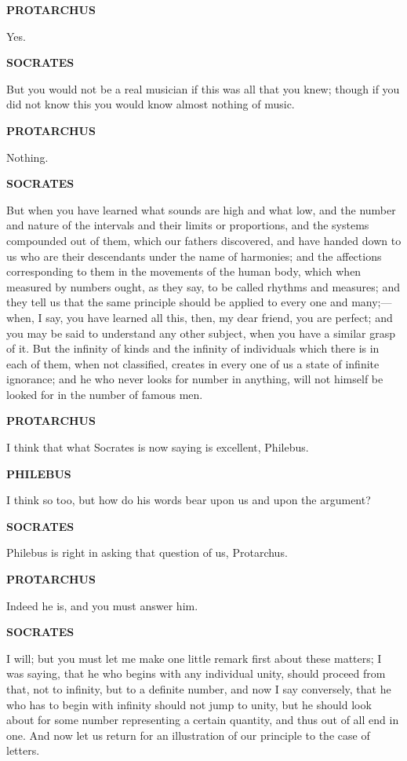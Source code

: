 \documentclass[11pt,letter]{article}
\begin{document}
\par \textbf{PROTARCHUS}
\par   Yes.

\par \textbf{SOCRATES}
\par   But you would not be a real musician if this was all that you knew; though if you did not know this you would know almost nothing of music.

\par \textbf{PROTARCHUS}
\par   Nothing.

\par \textbf{SOCRATES}
\par   But when you have learned what sounds are high and what low, and the number and nature of the intervals and their limits or proportions, and the systems compounded out of them, which our fathers discovered, and have handed down to us who are their descendants under the name of harmonies; and the affections corresponding to them in the movements of the human body, which when measured by numbers ought, as they say, to be called rhythms and measures; and they tell us that the same principle should be applied to every one and many;—when, I say, you have learned all this, then, my dear friend, you are perfect; and you may be said to understand any other subject, when you have a similar grasp of it. But the infinity of kinds and the infinity of individuals which there is in each of them, when not classified, creates in every one of us a state of infinite ignorance; and he who never looks for number in anything, will not himself be looked for in the number of famous men.

\par \textbf{PROTARCHUS}
\par   I think that what Socrates is now saying is excellent, Philebus.

\par \textbf{PHILEBUS}
\par   I think so too, but how do his words bear upon us and upon the argument?

\par \textbf{SOCRATES}
\par   Philebus is right in asking that question of us, Protarchus.

\par \textbf{PROTARCHUS}
\par   Indeed he is, and you must answer him.

\par \textbf{SOCRATES}
\par   I will; but you must let me make one little remark first about these matters; I was saying, that he who begins with any individual unity, should proceed from that, not to infinity, but to a definite number, and now I say conversely, that he who has to begin with infinity should not jump to unity, but he should look about for some number representing a certain quantity, and thus out of all end in one. And now let us return for an illustration of our principle to the case of letters.
\end{document}
